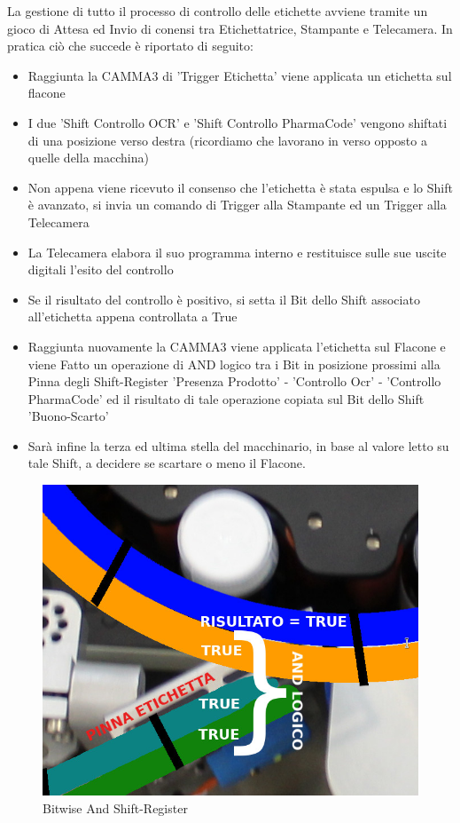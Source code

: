 \documentclass[12pt, a4paper, oneside]{book}
\begin{document}
La gestione di tutto il processo di controllo delle etichette avviene tramite un gioco di Attesa ed Invio di conensi tra Etichettatrice, Stampante e Telecamera. In pratica ciò che succede è riportato di seguito:
\begin{itemize}
	\item Raggiunta la CAMMA3 di 'Trigger Etichetta' viene applicata un etichetta sul flacone
	\item I due 'Shift Controllo OCR' e 'Shift Controllo PharmaCode' vengono shiftati di una posizione verso destra (ricordiamo che lavorano in verso opposto a quelle della macchina)
	\item Non appena viene ricevuto il consenso che l'etichetta è stata espulsa e lo Shift è avanzato, si invia un comando di Trigger alla Stampante ed un Trigger alla Telecamera
	\item La Telecamera elabora il suo programma interno e restituisce sulle sue uscite digitali l'esito del controllo
	\item Se il risultato del controllo è positivo, si setta il Bit dello Shift associato all'etichetta appena controllata a True
	\item Raggiunta nuovamente la CAMMA3 viene applicata l'etichetta sul Flacone e viene Fatto un operazione di AND logico tra i Bit in posizione prossimi alla Pinna degli Shift-Register 'Presenza Prodotto' - 'Controllo Ocr' - 'Controllo PharmaCode' ed il risultato di tale operazione copiata sul Bit dello Shift 'Buono-Scarto'
	\item Sarà infine la terza ed ultima stella del macchinario, in base al valore letto su tale Shift, a decidere se scartare o meno il Flacone. 
\end{itemize}

\begin{figure}[H]
	\centering
	\includegraphics[width=12cm]{Immagini/SH7}
	\caption{Bitwise And Shift-Register}
	\label{sh7}
\end{figure}
\end{document}
